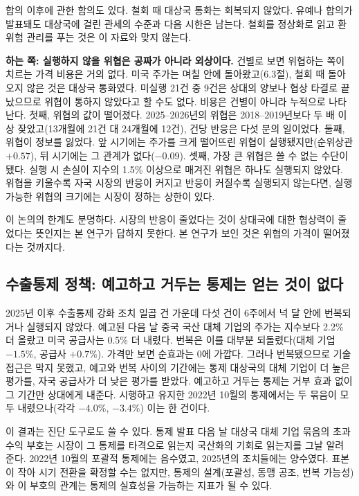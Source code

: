 \documentclass[11pt,a4paper]{article}
\begin{document}
합의 이후에 관한 함의도 있다. 철회 때 대상국 통화는 회복되지 않았다. 유예나 합의가 발표돼도 대상국에 걸린 관세의 수준과 다음 시한은 남는다. 철회를 정상화로 읽고 환위험 관리를 푸는 것은 이 자료와 맞지 않는다.

\textbf{하는 쪽: 실행하지 않을 위협은 공짜가 아니라 외상이다.} 건별로 보면 위협하는 쪽이 치르는 가격 비용은 거의 없다. 미국 주가는 며칠 안에 돌아왔고(6.3절), 철회 때 돌아오지 않은 것은 대상국 통화였다. 미실행 21건 중 9건은 상대의 양보나 협상 타결로 끝났으므로 위협이 통하지 않았다고 할 수도 없다. 비용은 건별이 아니라 누적으로 나타난다. 첫째, 위협의 값이 떨어졌다. 2025--2026년의 위협은 2018--2019년보다 두 배 이상 잦았고(13개월에 21건 대 24개월에 12건), 건당 반응은 다섯 분의 일이었다. 둘째, 위협이 정보를 잃었다. 앞 시기에는 주가를 크게 떨어뜨린 위협이 실행됐지만(순위상관 $+0.57$), 뒤 시기에는 그 관계가 없다($-0.09$). 셋째, 가장 큰 위협은 쓸 수 없는 수단이 됐다. 실행 시 손실이 지수의 1.5\% 이상으로 매겨진 위협은 하나도 실행되지 않았다. 위협을 키울수록 자국 시장의 반응이 커지고 반응이 커질수록 실행되지 않는다면, 실행 가능한 위협의 크기에는 시장이 정하는 상한이 있다.

이 논의의 한계도 분명하다. 시장의 반응이 줄었다는 것이 상대국에 대한 협상력이 줄었다는 뜻인지는 본 연구가 답하지 못한다. 본 연구가 보인 것은 위협의 가격이 떨어졌다는 것까지다.

\subsection{수출통제 정책: 예고하고 거두는 통제는 얻는 것이 없다}

2025년 이후 수출통제 강화 조치 일곱 건 가운데 다섯 건이 6주에서 넉 달 안에 번복되거나 실행되지 않았다. 예고된 다음 날 중국 국산 대체 기업의 주가는 지수보다 2.2\% 더 올랐고 미국 공급사는 0.5\% 더 내렸다. 번복은 이를 대부분 되돌렸다(대체 기업 $-1.5$\%, 공급사 $+0.7$\%). 가격만 보면 순효과는 0에 가깝다. 그러나 번복됐으므로 기술 접근은 막지 못했고, 예고와 번복 사이의 기간에는 통제 대상국의 대체 기업이 더 높은 평가를, 자국 공급사가 더 낮은 평가를 받았다. 예고하고 거두는 통제는 거부 효과 없이 그 기간만 상대에게 내준다. 시행하고 유지한 2022년 10월의 통제에서는 두 묶음이 모두 내렸으나(각각 $-4.0$\%, $-3.4$\%) 이는 한 건이다.

이 결과는 진단 도구로도 쓸 수 있다. 통제 발표 다음 날 대상국 대체 기업 묶음의 초과수익 부호는 시장이 그 통제를 타격으로 읽는지 국산화의 기회로 읽는지를 그날 알려 준다. 2022년 10월의 포괄적 통제에는 음수였고, 2025년의 조치들에는 양수였다. 표본이 작아 시기 전환을 확정할 수는 없지만, 통제의 설계(포괄성, 동맹 공조, 번복 가능성)와 이 부호의 관계는 통제의 실효성을 가늠하는 지표가 될 수 있다.
\end{document}
